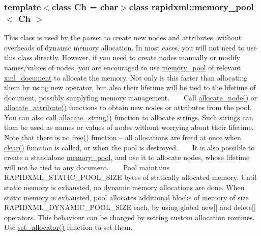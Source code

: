 \subsubsection*{template$<$class Ch = char$>$class rapidxml\+::memory\+\_\+pool$<$ Ch $>$}

This class is used by the parser to create new nodes and attributes, without overheads of dynamic memory allocation. In most cases, you will not need to use this class directly. However, if you need to create nodes manually or modify names/values of nodes, you are encouraged to use \hyperlink{classrapidxml_1_1memory__pool}{memory\+\_\+pool} of relevant \hyperlink{classrapidxml_1_1xml__document}{xml\+\_\+document} to allocate the memory. Not only is this faster than allocating them by using {\ttfamily new} operator, but also their lifetime will be tied to the lifetime of document, possibly simplyfing memory management. ~\newline
~\newline
 Call \hyperlink{classrapidxml_1_1memory__pool_a4118581c29ee9a2f6b55ebf7dac185f8}{allocate\+\_\+node()} or \hyperlink{classrapidxml_1_1memory__pool_a3de2a66c983336e006ea3844e244ed30}{allocate\+\_\+attribute()} functions to obtain new nodes or attributes from the pool. You can also call \hyperlink{classrapidxml_1_1memory__pool_a171941b39d55b868358da97462185f58}{allocate\+\_\+string()} function to allocate strings. Such strings can then be used as names or values of nodes without worrying about their lifetime. Note that there is no {\ttfamily free()} function -- all allocations are freed at once when \hyperlink{classrapidxml_1_1memory__pool_aad377c835fdaed1cb2cc9df194cf84e4}{clear()} function is called, or when the pool is destroyed. ~\newline
~\newline
 It is also possible to create a standalone \hyperlink{classrapidxml_1_1memory__pool}{memory\+\_\+pool}, and use it to allocate nodes, whose lifetime will not be tied to any document. ~\newline
~\newline
 Pool maintains {\ttfamily R\+A\+P\+I\+D\+X\+M\+L\+\_\+\+S\+T\+A\+T\+I\+C\+\_\+\+P\+O\+O\+L\+\_\+\+S\+I\+Z\+E} bytes of statically allocated memory. Until static memory is exhausted, no dynamic memory allocations are done. When static memory is exhausted, pool allocates additional blocks of memory of size {\ttfamily R\+A\+P\+I\+D\+X\+M\+L\+\_\+\+D\+Y\+N\+A\+M\+I\+C\+\_\+\+P\+O\+O\+L\+\_\+\+S\+I\+Z\+E} each, by using global {\ttfamily new\mbox{[}\mbox{]}} and {\ttfamily delete\mbox{[}\mbox{]}} operators. This behaviour can be changed by setting custom allocation routines. Use \hyperlink{classrapidxml_1_1memory__pool_a84d3d8d2cdfc00501e1dcf26d889ae03}{set\+\_\+allocator()} function to set them. ~\newline
